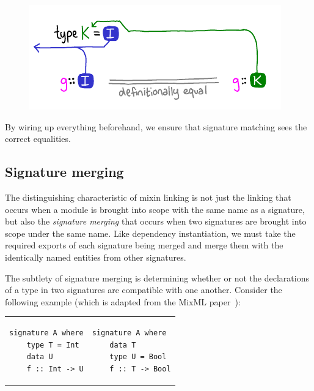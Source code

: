 \begin{figure}[H]
\center\includegraphics{figures/instantiation-with-synonyms-reduced.pdf}
\end{figure}

\noindent
By wiring up everything beforehand, we ensure that signature matching
sees the correct equalities.


\subsection{Signature merging}
\label{sec:signature-merging}

The distinguishing characteristic of mixin
linking is not just the linking that occurs when a module is brought into
scope with the same name as a signature, but also the \emph{signature merging}
that occurs when two signatures are brought into scope under the same name.
Like dependency instantiation, we must take the required exports of each
signature being merged and merge them with the identically
named entities from other signatures.


The subtlety of signature merging is determining whether or not the declarations
of a type in two signatures are compatible with one another.  Consider
the following example (which is adapted from the MixML paper~\cite{rossberg+:mixml}):

\begin{tabular}{p{} p{}}
\begin{lstlisting}
signature A where
    type T = Int
    data U
    f :: Int -> U
\end{lstlisting}
&
\begin{lstlisting}
signature A where
    data T
    type U = Bool
    f :: T -> Bool
\end{lstlisting}
\end{tabular}

